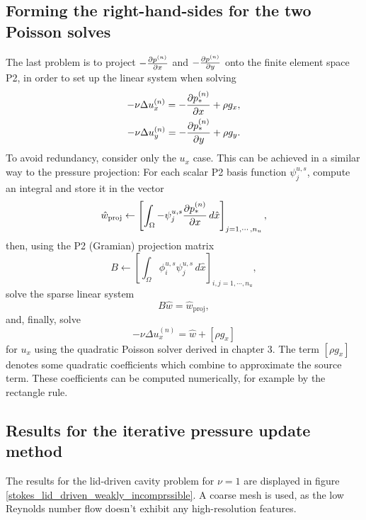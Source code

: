 \subsection{Forming the right-hand-sides for the two Poisson solves}
The last problem is to project $-\frac{\partial p^{(n)}}{\partial x}$ and $-\frac{\partial p^{(n)}}{\partial y}$ onto the finite element space P2,
in order to set up the linear system when solving
\begin{align*}
    -\nu\Delta u_x^{(n)} = -\frac{\partial p_*^{(n)}}{\partial x} + \rho g_x,\\
    -\nu\Delta u_y^{(n)} = -\frac{\partial p_*^{(n)}}{\partial y} + \rho g_y.
\end{align*}
To avoid redundancy, consider only the $u_x$ case.
This can be achieved in a similar way to the pressure projection: For each scalar P2 basis function $\psi^{u,s}_j$, compute an integral
and store it in the vector
$$
    \hat{w}_{\text{proj}} \leftarrow \left[\int_\Omega -\psi^{u,s}_j \frac{\partial p_*^{(n)}}{\partial x}\,d\hat{x}\right]_{j=1,\cdots,n_u},
$$
then, using the P2 (Gramian) projection matrix
$$
    B \leftarrow \left[ \int_\Omega \phi^{u,s}_i\psi^{u,s}_j \,d\hat{x}\right]_{i,j=1,\cdots,n_u},
$$
solve the sparse linear system
$$
    B\hat{w} = \hat{w}_{\text{proj}},
$$
and, finally, solve
$$
    -\nu\Delta u_x^{(n)} = \hat{w} + \left[\rho g_x\right]
$$
for $u_x$ using the quadratic Poisson solver derived in chapter 3. The term $\left[\rho g_x\right]$ denotes some quadratic coefficients
which combine to approximate the source term. These coefficients can be computed numerically, for example by the rectangle rule.

\subsection{Results for the iterative pressure update method}
The results for the lid-driven cavity problem for $\nu = 1$ are displayed in figure \ref{stokes_lid_driven_weakly_incomprssible}.
A coarse mesh is used, as the low Reynolds number flow doesn't exhibit any high-resolution features.

